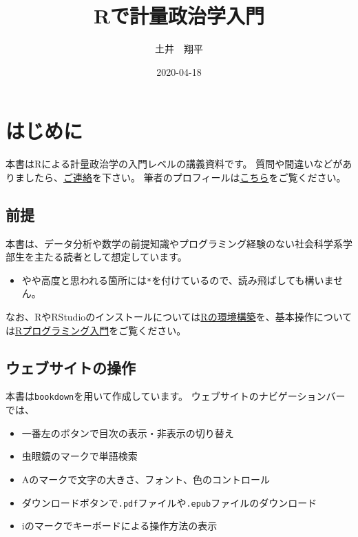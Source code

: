 \documentclass[]{bxjsarticle}
\title{Rで計量政治学入門}
\author{土井　翔平}
\date{2020-04-18}
\providecommand{\tightlist}{%
  \setlength{\itemsep}{0pt}\setlength{\parskip}{0pt}}
\begin{document}
\maketitle

{
\setcounter{tocdepth}{2}
\tableofcontents
}
\hypertarget{index}{%
\section*{はじめに}\label{index}}

本書はRによる計量政治学の入門レベルの講義資料です。
質問や間違いなどがありましたら、\href{mailto:shohei.doi0504@gmail.com}{ご連絡}を下さい。
筆者のプロフィールは\href{https://shohei-doi.github.io/}{こちら}をご覧ください。

\hypertarget{ux524dux63d0}{%
\subsection*{前提}\label{ux524dux63d0}}

本書は、データ分析や数学の前提知識やプログラミング経験のない社会科学系学部生を主たる読者として想定しています。

\begin{itemize}
\tightlist
\item
  やや高度と思われる箇所には\texttt{*}を付けているので、読み飛ばしても構いません。
\end{itemize}

なお、RやRStudioのインストールについては\protect\hyperlink{install-r}{Rの環境構築}を、基本操作については\protect\hyperlink{intro-r}{Rプログラミング入門}をご覧ください。

\hypertarget{ux30a6ux30a7ux30d6ux30b5ux30a4ux30c8ux306eux64cdux4f5c}{%
\subsection*{ウェブサイトの操作}\label{ux30a6ux30a7ux30d6ux30b5ux30a4ux30c8ux306eux64cdux4f5c}}

本書は\texttt{bookdown}を用いて作成しています。
ウェブサイトのナビゲーションバーでは、

\begin{itemize}
\tightlist
\item
  一番左のボタンで目次の表示・非表示の切り替え
\item
  虫眼鏡のマークで単語検索
\item
  Aのマークで文字の大きさ、フォント、色のコントロール
\item
  ダウンロードボタンで\texttt{.pdf}ファイルや\texttt{.epub}ファイルのダウンロード
\item
  iのマークでキーボードによる操作方法の表示
\end{itemize}
\end{document}
